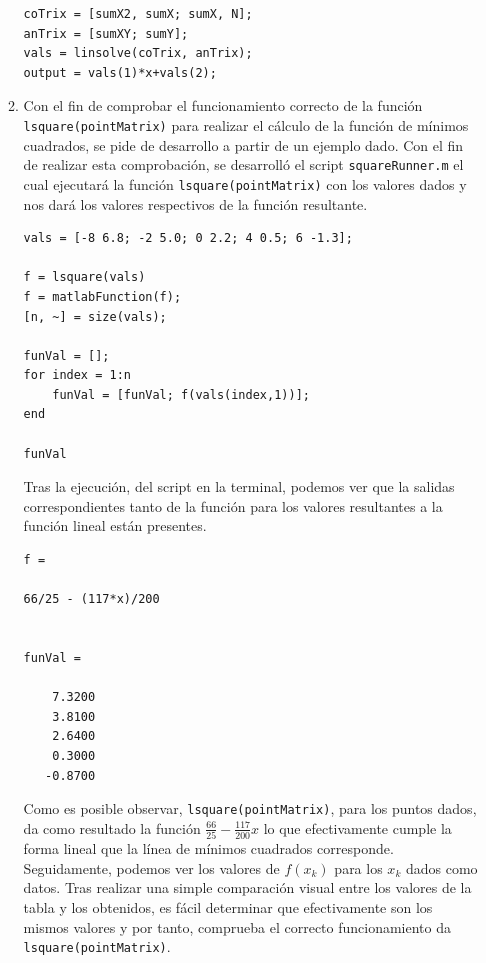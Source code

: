 \documentclass[english,notitlepage,letterpaper, 10pt]{article} %
\begin{document}
\begin{enumerate}
\begin{enumerate}
      \begin{lstlisting}
coTrix = [sumX2, sumX; sumX, N];
anTrix = [sumXY; sumY];
vals = linsolve(coTrix, anTrix);
output = vals(1)*x+vals(2);
      \end{lstlisting}

      \item Con el fin de comprobar el funcionamiento correcto de la función \texttt{lsquare(pointMatrix)} para realizar el cálculo de la función de mínimos cuadrados, se pide de desarrollo a partir de un ejemplo dado. Con el fin de realizar esta comprobación, se desarrolló el script \texttt{squareRunner.m} el cual ejecutará la función \texttt{lsquare(pointMatrix)} con los valores dados y nos dará los valores respectivos de la función resultante.
      
      \begin{lstlisting}
vals = [-8 6.8; -2 5.0; 0 2.2; 4 0.5; 6 -1.3];

f = lsquare(vals)
f = matlabFunction(f);
[n, ~] = size(vals);

funVal = [];
for index = 1:n
    funVal = [funVal; f(vals(index,1))];
end

funVal
    \end{lstlisting}

      Tras la ejecución, del script en la terminal, podemos ver que la salidas correspondientes tanto de la función para los valores resultantes a la función lineal están presentes.

      \begin{lstlisting}
f =

66/25 - (117*x)/200


funVal =

    7.3200
    3.8100
    2.6400
    0.3000
   -0.8700
      \end{lstlisting}

      Como es posible observar, \texttt{lsquare(pointMatrix)}, para los puntos dados, da como resultado la función $\frac{66}{25} - \frac{117}{200}x$ lo que efectivamente cumple la forma lineal que la línea de mínimos cuadrados corresponde. Seguidamente, podemos ver los valores de $f(x_k)$ para los $x_k$ dados como datos. Tras realizar una simple comparación visual entre los valores de la tabla y los obtenidos, es fácil determinar que efectivamente son los mismos valores y por tanto, comprueba el correcto funcionamiento da \texttt{lsquare(pointMatrix)}.


\end{enumerate}
\end{enumerate}
\end{document}
